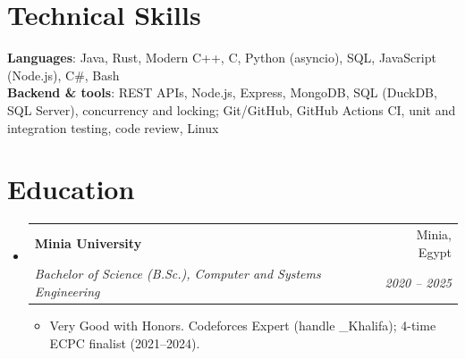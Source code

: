 \documentclass[letterpaper,11pt]{article}
\makeatletter
\newcommand{\resumeItem}[1]{
  \item\small{
    {#1 \vspace{-2pt}}
  }
}
\newcommand{\resumeSubheading}[4]{
  \vspace{-2pt}\item
    \begin{tabular*}{0.97\textwidth}[t]{l@{\extracolsep{\fill}}r}
      \textbf{#1} & #2 \\
      \textit{\small#3} & \textit{\small #4} \\
    \end{tabular*}\vspace{-7pt}
}
\newcommand{\resumeSubHeadingListStart}{\begin{itemize}[leftmargin=0.15in, label={}]}
\newcommand{\resumeSubHeadingListEnd}{\end{itemize}}
\newcommand{\resumeItemListStart}{\begin{itemize}}
\newcommand{\resumeItemListEnd}{\end{itemize}\vspace{-5pt}}
\makeatother
\begin{document}
%
\section{Technical Skills}
 \begin{itemize}[leftmargin=0.15in, label={}]
    \small{\item{
     \textbf{Languages}{: Java, Rust, Modern C++, C, Python (asyncio), SQL, JavaScript (Node.js), C\#, Bash} \\
     \textbf{Backend \& tools}{: REST APIs, Node.js, Express, MongoDB, SQL (DuckDB, SQL Server), concurrency and locking; Git/GitHub, GitHub Actions CI, unit and integration testing, code review, Linux}
    }}
 \end{itemize}

\section{Education}
  \resumeSubHeadingListStart
    \resumeSubheading
      {Minia University}{Minia, Egypt}
      {Bachelor of Science (B.Sc.), Computer and Systems Engineering}{2020 -- 2025}
      \resumeItemListStart
        \resumeItem{Very Good with Honors. Codeforces Expert (handle \_Khalifa); 4-time ECPC finalist (2021--2024).}
      \resumeItemListEnd
  \resumeSubHeadingListEnd


\end{document}
